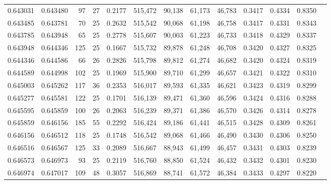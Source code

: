 \begin{tabular}{rrrrrrrrrrrrr}
0.643031 & 0.643480 &    97 &  27 &                                     0.2177 & 515,472 &  90,138 &  61,173 &  46,783 & 0.3417 & 0.4334 & 0.8350 \\
0.643485 & 0.643781 &    70 &  25 &                                     0.2632 & 515,542 &  90,068 &  61,198 &  46,758 & 0.3417 & 0.4331 & 0.8343 \\
0.643785 & 0.643948 &    65 &  25 &                                     0.2778 & 515,607 &  90,003 &  61,223 &  46,733 & 0.3418 & 0.4329 & 0.8337 \\
0.643948 & 0.644346 &   125 &  25 &                                     0.1667 & 515,732 &  89,878 &  61,248 &  46,708 & 0.3420 & 0.4327 & 0.8325 \\
0.644346 & 0.644586 &    66 &  26 &                                     0.2826 & 515,798 &  89,812 &  61,274 &  46,682 & 0.3420 & 0.4324 & 0.8319 \\
0.644589 & 0.644998 &   102 &  25 &                                     0.1969 & 515,900 &  89,710 &  61,299 &  46,657 & 0.3421 & 0.4322 & 0.8310 \\
0.645003 & 0.645262 &   117 &  36 &                                     0.2353 & 516,017 &  89,593 &  61,335 &  46,621 & 0.3423 & 0.4319 & 0.8299 \\
0.645277 & 0.645581 &   122 &  25 &                                     0.1701 & 516,139 &  89,471 &  61,360 &  46,596 & 0.3424 & 0.4316 & 0.8288 \\
0.645595 & 0.645859 &   100 &  26 &                                     0.2063 & 516,239 &  89,371 &  61,386 &  46,570 & 0.3426 & 0.4314 & 0.8278 \\
0.645859 & 0.646156 &   185 &  55 &                                     0.2292 & 516,424 &  89,186 &  61,441 &  46,515 & 0.3428 & 0.4309 & 0.8261 \\
0.646156 & 0.646512 &   118 &  25 &                                     0.1748 & 516,542 &  89,068 &  61,466 &  46,490 & 0.3430 & 0.4306 & 0.8250 \\
0.646516 & 0.646567 &   125 &  33 &                                     0.2089 & 516,667 &  88,943 &  61,499 &  46,457 & 0.3431 & 0.4303 & 0.8239 \\
0.646573 & 0.646973 &    93 &  25 &                                     0.2119 & 516,760 &  88,850 &  61,524 &  46,432 & 0.3432 & 0.4301 & 0.8230 \\
0.646974 & 0.647017 &   109 &  48 &                                     0.3057 & 516,869 &  88,741 &  61,572 &  46,384 & 0.3433 & 0.4297 & 0.8220 \\

\end{tabular}
